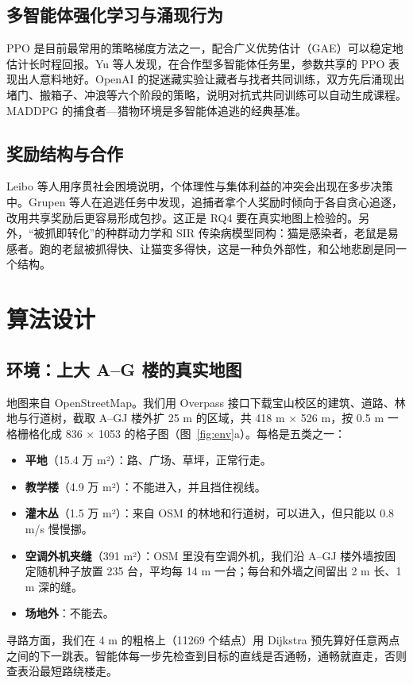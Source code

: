 \documentclass[a4paper,zihao=5,fontset=fandol,UTF8]{ctexart}
\begin{document}
\subsection{多智能体强化学习与涌现行为}
PPO 是目前最常用的策略梯度方法之一\cite{schulman2017ppo}，配合广义优势估计（GAE）可以稳定地估计长时程回报\cite{schulman2016gae}。Yu 等人发现，在合作型多智能体任务里，参数共享的 PPO 表现出人意料地好\cite{yu2022mappo}。OpenAI 的捉迷藏实验让藏者与找者共同训练，双方先后涌现出堵门、搬箱子、冲浪等六个阶段的策略\cite{baker2020}，说明对抗式共同训练可以自动生成课程。MADDPG 的捕食者—猎物环境是多智能体追逃的经典基准\cite{lowe2017}。

\subsection{奖励结构与合作}
Leibo 等人用序贯社会困境说明，个体理性与集体利益的冲突会出现在多步决策中\cite{leibo2017}。Grupen 等人在追逃任务中发现，追捕者拿个人奖励时倾向于各自贪心追逐，改用共享奖励后更容易形成包抄\cite{grupen2022}。这正是 RQ4 要在真实地图上检验的。另外，“被抓即转化”的种群动力学和 SIR 传染病模型同构：猫是感染者，老鼠是易感者\cite{kermack1927}。跑的老鼠被抓得快、让猫变多得快，这是一种负外部性，和公地悲剧是同一个结构\cite{hardin1968}。

\section{算法设计}
\subsection{环境：上大 A–G 楼的真实地图}
地图来自 OpenStreetMap\cite{osm}。我们用 Overpass 接口下载宝山校区的建筑、道路、林地与行道树，截取 A–GJ 楼外扩 25 m 的区域，共 418 m × 526 m，按 0.5 m 一格栅格化成 836 × 1053 的格子图（图~\ref{fig:env}a）。每格是五类之一：
\begin{itemize}
  \item \textbf{平地}（15.4 万 m²）：路、广场、草坪，正常行走。
  \item \textbf{教学楼}（4.9 万 m²）：不能进入，并且挡住视线。
  \item \textbf{灌木丛}（1.5 万 m²）：来自 OSM 的林地和行道树，可以进入，但只能以 0.8 m/s 慢慢挪。
  \item \textbf{空调外机夹缝}（391 m²）：OSM 里没有空调外机，我们沿 A–GJ 楼外墙按固定随机种子放置 235 台，平均每 14 m 一台；每台和外墙之间留出 2 m 长、1 m 深的缝。
  \item \textbf{场地外}：不能去。
\end{itemize}
寻路方面，我们在 4 m 的粗格上（11269 个结点）用 Dijkstra 预先算好任意两点之间的下一跳表。智能体每一步先检查到目标的直线是否通畅，通畅就直走，否则查表沿最短路绕楼走。
\end{document}
